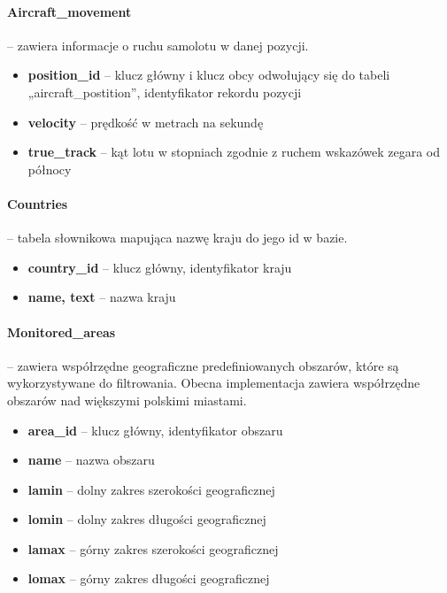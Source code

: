 \documentclass[12pt,a4paper]{article}
\begin{document}
\paragraph{Aircraft\_movement} – zawiera informacje o ruchu samolotu w danej pozycji.
\begin{itemize}
    \item \textbf{position\_id} – klucz główny i klucz obcy odwołujący się do tabeli „aircraft\_postition”, identyfikator rekordu pozycji
    \item \textbf{velocity} – prędkość w metrach na sekundę
    \item \textbf{true\_track} – kąt lotu w stopniach zgodnie z ruchem wskazówek zegara od północy
\end{itemize}

\paragraph{Countries} – tabela słownikowa mapująca nazwę kraju do jego id w bazie.
\begin{itemize}
    \item \textbf{country\_id} – klucz główny, identyfikator kraju
    \item \textbf{name, text} – nazwa kraju
\end{itemize}

\paragraph{Monitored\_areas} – zawiera współrzędne geograficzne predefiniowanych obszarów, które są wykorzystywane do filtrowania. Obecna implementacja zawiera współrzędne obszarów nad większymi polskimi miastami.
\begin{itemize}
    \item \textbf{area\_id} – klucz główny, identyfikator obszaru
    \item \textbf{name} – nazwa obszaru
    \item \textbf{lamin} – dolny zakres szerokości geograficznej
    \item \textbf{lomin} – dolny zakres długości geograficznej
    \item \textbf{lamax} – górny zakres szerokości geograficznej
    \item \textbf{lomax} – górny zakres długości geograficznej
\end{itemize}
\end{document}
